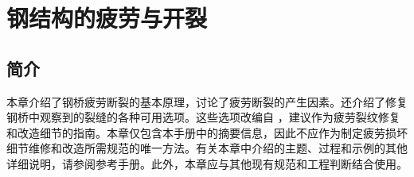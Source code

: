 \chapter{钢结构的疲劳与开裂}\label{chp:fatigue-fracture-steel-structures}
\section{简介}
本章介绍了钢桥疲劳断裂的基本原理，讨论了疲劳断裂的产生因素。还介绍了修复钢桥中观察到的裂缝的各种可用选项。这些选项改编自  \cite{dexter2008m}，建议作为疲劳裂纹修复和改造细节的指南。本章仅包含本手册中的摘要信息，因此不应作为制定疲劳损坏细节维修和改造所需规范的唯一方法。有关本章中介绍的主题、过程和示例的其他详细说明，请参阅参考手册。此外，本章应与其他现有规范和工程判断结合使用。

